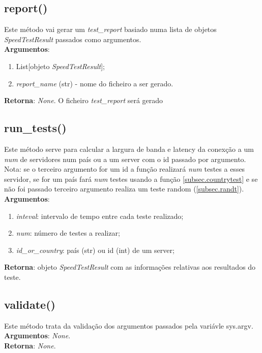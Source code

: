\documentclass{report}
\begin{document}
\subsection{report()}
\label{subsec.report}
Este método vai gerar um \textit{test\_report} basiado numa lista de objetos \textit{SpeedTestResult} passados como argumentos.\\ 
\textbf{Argumentos}:
\begin{enumerate}
\item List[objeto \textit{SpeedTestResult}];
\item \textit{report\_name} (str) - nome do ficheiro a ser gerado.
\end{enumerate}
\textbf{Retorna}: \textit{None}. O ficheiro \textit{test\_report} será gerado

\subsection{run\_tests()}
\label{subsec.runt}
Este método serve para calcular a largura de banda e latency da conexção a um \textit{num} de servidores num país ou a um server com o id passado por argumento.\\
Nota: se o terceiro argumento for um id a função realizará \textit{num} testes a esses servidor, se for um país fará \textit{num} testes usando a função \autoref{subsec.countrytest} e se não foi passado terceiro argumento realiza um teste random (\autoref{subsec.randt}).\\
\textbf{Argumentos}: 
\begin{enumerate}
\item \textit{inteval}: intervalo de tempo entre cada teste realizado;
\item \textit{num}: número de testes a realizar;
\item \textit{id\_or\_country}: país (str) ou id (int) de um server;
\end{enumerate}
\textbf{Retorna}: objeto \textit{SpeedTestResult} com as informações relativas aos resultados do teste.

\subsection{validate()}
\label{subsec.validate}
Este método trata da validação dos argumentos passados pela variávle sys.argv.\\ 
\textbf{Argumentos}: \textit{None}.\\
\textbf{Retorna}: \textit{None}.
\end{document}

